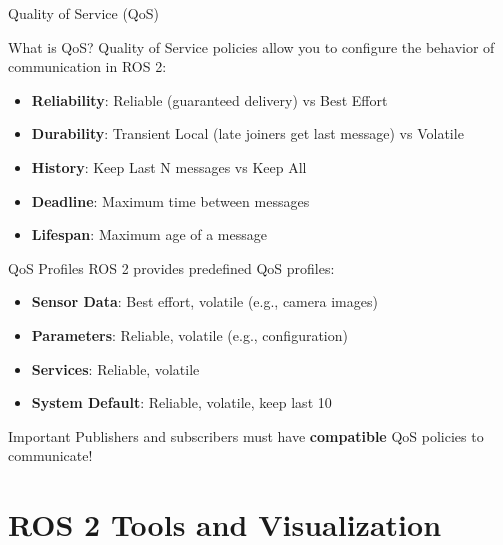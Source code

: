\begin{frame}[allowframebreaks]{Quality of Service (QoS)}
    \begin{block}{What is QoS?}
        Quality of Service policies allow you to configure the behavior of communication in ROS 2:
        \begin{itemize}
            \item \textbf{Reliability}: Reliable (guaranteed delivery) vs Best Effort
            \item \textbf{Durability}: Transient Local (late joiners get last message) vs Volatile
            \item \textbf{History}: Keep Last N messages vs Keep All
            \item \textbf{Deadline}: Maximum time between messages
            \item \textbf{Lifespan}: Maximum age of a message
        \end{itemize}
    \end{block}

    \framebreak

    \begin{block}{QoS Profiles}
        ROS 2 provides predefined QoS profiles:
        \begin{itemize}
            \item \textbf{Sensor Data}: Best effort, volatile (e.g., camera images)
            \item \textbf{Parameters}: Reliable, volatile (e.g., configuration)
            \item \textbf{Services}: Reliable, volatile
            \item \textbf{System Default}: Reliable, volatile, keep last 10
        \end{itemize}
    \end{block}

    \begin{alertblock}{Important}
        Publishers and subscribers must have \textbf{compatible} QoS policies to communicate!
    \end{alertblock}
\end{frame}

\section{ROS 2 Tools and Visualization}

